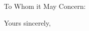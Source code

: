 \documentclass{letter}
\title{\lettertitle}
\begin{document}
\begin{letter}{}
\opening{To Whom it May Concern:}

\lipsum[1-3]

\closing{Yours sincerely,\\
	\fromsig{\handwrittensig}\\
}
\end{letter}
\end{document}

